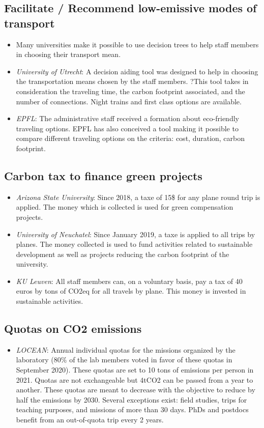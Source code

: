\documentclass[version=3.21, pagesize, twoside=off, bibliography=totoc, DIV=calc, fontsize=12pt, a4paper, french, english]{scrartcl}
\begin{document}
\subsection{Facilitate / Recommend low-emissive modes of transport}
\begin{itemize}
\item Many universities make it possible to use decision trees to help staff members in choosing their transport mean. 
\item \emph{University of Utrecht}: A decision aiding tool was designed to help in choosing the transportation means chosen by the staff members. ?This tool takes in consideration the traveling time, the carbon footprint associated, and the number of  connections. Night trains and first class options are available. 
\item \emph{EPFL}: The administrative staff received a formation about eco-friendly traveling options. EPFL has also conceived a tool making it possible to compare different traveling options on the criteria: cost, duration, carbon footprint.
\end{itemize}

\subsection{Carbon tax to finance green projects}
\begin{itemize}
\item \emph{Arizona State University}: Since 2018, a taxe of 15\$ for any plane round trip is applied. The money which is collected is used for green compensation projects.
\item \emph{University of Neuchatel}: Since January 2019, a taxe is applied to all trips by planes. The money collected is used to fund activities related to sustainable development as well as projects reducing the carbon footprint of the university.
\item \emph{KU Leuven}: All staff members can, on a voluntary basis, pay a tax of 40 euros by tons of CO2eq for all travels by plane. This money is invested in sustainable activities.
\end{itemize}

\subsection{Quotas on CO2 emissions}
\begin{itemize}
\item \emph{LOCEAN}: Annual individual quotas for the missions organized by the laboratory ($80\%$ of the lab members voted in favor of these quotas in September 2020). These quotas are set to 10 tons of emissions per person in 2021. Quotas are not exchangeable but 4tCO2 can be passed from a year to another. These quotas are meant to decrease with the objective to reduce by half the emissions by 2030. Several exceptions exist: field studies, trips for teaching purposes, and missions of more than 30 days. PhDs and postdocs benefit from an out-of-quota trip every 2 years.
\end{itemize}
\end{document}

